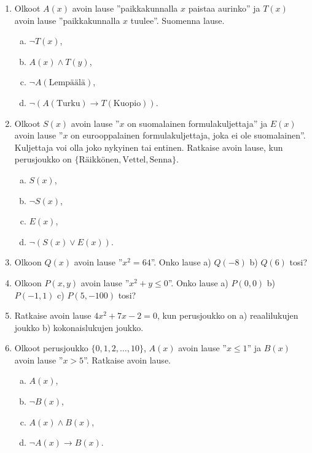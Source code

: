 \Harjoitustehtavat

\begin{enumerate}
\item
Olkoot $A(x)$ avoin lause ''paikkakunnalla $x$ paistaa
aurinko'' ja $T(x)$ avoin lause ''paikkakunnalla $x$
tuulee''. Suomenna lause.
\begin{enumerate}[a)]
\item $\lnot T(x)$,
\item $A(x) \land T(y)$,
\item $\lnot A(\textrm{Lempäälä})$,
\item $\lnot (A(\textrm{Turku}) \to T(\textrm{Kuopio}))$.
\end{enumerate}

\item
Olkoot $S(x)$ avoin lause ''$x$ on suomalainen
formulakuljettaja'' ja $E(x)$ avoin lause ''$x$ on
eurooppalainen formulakuljettaja, joka ei ole
suomalainen''. Kuljettaja voi olla joko nykyinen tai
entinen. Ratkaise avoin lause, kun perusjoukko on
$\{\textrm{Räikkönen}, \textrm{Vettel}, \textrm{Senna}\}$.
\begin{enumerate}[a)]
\item $S(x)$,
\item $\lnot S(x)$,
\item $E(x)$,
\item $\lnot (S(x) \lor E(x))$.
\end{enumerate}

\item
Olkoon $Q(x)$ avoin lause ''$x^2 = 64$''. Onko lause a)
$Q(-8)$ b) $Q(6)$ tosi?

\item
Olkoon $P(x, y)$ avoin lause ''$x^2 + y \le 0$''. Onko
lause a) $P(0, 0)$ b) $P(-1, 1)$ c) $P(5, -100)$ tosi?

\item
Ratkaise avoin lause $4x^2 + 7x - 2 = 0$, kun perusjoukko
on a) reaalilukujen joukko b) kokonaislukujen joukko.

\item
Olkoot perusjoukko $\{ 0, 1, 2, \ldots , 10\}$, $A(x)$
avoin lause ''$x \le 1$'' ja $B(x)$ avoin lause ''$x > 5$''.
Ratkaise avoin lause.
\begin{enumerate}[a)]
\item $A(x)$,
\item $\lnot B(x)$,
\item $A(x) \land B(x)$,
\item $\lnot A(x) \to B(x)$.
\end{enumerate}


\end{enumerate}
